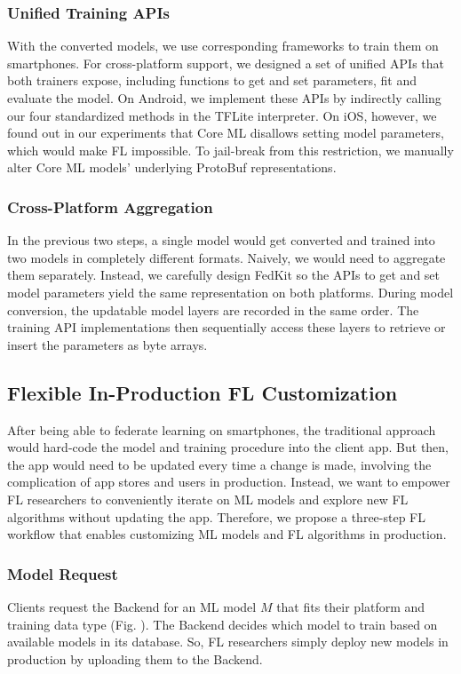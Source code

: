 \documentclass[letterpaper]{article} %
\begin{document}
\subsubsection{Unified Training APIs}
With the converted models, we use corresponding frameworks to train them
on smartphones.
For cross-platform support,
we designed a set of unified APIs that both trainers expose,
including functions to get and set parameters, fit and evaluate the model.
On Android, we implement these APIs by indirectly calling
our four standardized methods in the TFLite interpreter.
On iOS, however, we found out in our experiments that
Core ML disallows setting model parameters,
which would make FL impossible.
To jail-break from this restriction, we manually alter
Core ML models' underlying ProtoBuf representations.

\subsubsection{Cross-Platform Aggregation}
In the previous two steps,
a single model would get converted and trained into two models in
completely different formats.
Naively, we would need to aggregate them separately.
Instead, we carefully design FedKit so the APIs to get and set model parameters
yield the same representation on both platforms.
During model conversion,
the updatable model layers are recorded in the same order.
The training API implementations then sequentially access these layers to
retrieve or insert the parameters as byte arrays.

\subsection{Flexible In-Production FL Customization}
\newcommand{\model}{$M$}
\newcommand{\fs}{$S_\mathrm F$}
After being able to federate learning on smartphones,
the traditional approach would hard-code the model and training procedure
into the client app.
But then, the app would need to be updated every time a change is made,
involving the complication of app stores and users in production.
Instead,
we want to empower FL researchers to conveniently iterate on ML models and
explore new FL algorithms
without updating the app.
Therefore, we propose a three-step FL workflow that
enables customizing ML models and FL algorithms in production.

\subsubsection{Model Request}
Clients request the Backend for an ML model \model{} that fits
their platform and training data type (Fig. ). %
The Backend decides which model to train based on
available models in its database.
So, FL researchers simply deploy new models in production by uploading them to
the Backend.
\end{document}
